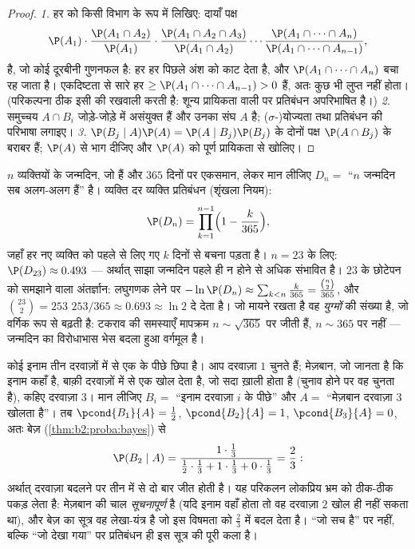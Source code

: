 \begin{proof}
\emph{1.} हर  को किसी विभाग के रूप में लिखिए:
दायाँ पक्ष
\[
\P(A_1)\cdot\frac{\P(A_1 \cap A_2)}{\P(A_1)}\cdot
\frac{\P(A_1 \cap A_2 \cap A_3)}{\P(A_1 \cap A_2)}\cdots
\frac{\P(A_1 \cap \dots \cap A_n)}{\P(A_1 \cap \dots \cap
A_{n-1})},
\]
है, जो कोई दूरबीनी गुणनफल है: हर हर पिछले अंश को काट देता है, और
$\P(A_1 \cap \dots \cap A_n)$ बचा रह जाता है। एकदिष्टता से सारे हर $\geq \P(A_1 \cap \dots \cap A_{n-1}) >
0$ हैं, अतः कुछ भी लुप्त
नहीं होता। (परिकल्पना ठीक इसी की रखवाली करती है: शून्य प्रायिकता
वाली  पर प्रतिबंधन अपरिभाषित है।)
\emph{2.} समुच्चय $A \cap B_i$ जोड़े-जोड़े में असंयुक्त हैं और उनका संघ $A$
है; ($\sigma$-)योज्यता तथा प्रतिबंधन की परिभाषा लगाइए।
\emph{3.} $\P(B_j \mid A)\P(A) = \P(A \mid
B_j)\P(B_j)$ के दोनों पक्ष $\P(A \cap B_j)$ के बराबर हैं; $\P(A)$ से भाग दीजिए और
$\P(A)$ को पूर्ण प्रायिकता से खोलिए।
\end{proof}

\begin{example}[जन्मदिन का टकराव, शृंखला नियम
से]\label{ex:b2:proba:birthday}
$n$ व्यक्तियों के जन्मदिन, जो  हैं और $365$ दिनों पर एकसमान,
लेकर मान लीजिए $D_n = {}$ ``$n$ जन्मदिन सब अलग-अलग हैं'' है। व्यक्ति दर
व्यक्ति प्रतिबंधन (शृंखला नियम):
\[
\P(D_n) = \prod_{k=1}^{n-1}\Bigl(1 - \frac{k}{365}\Bigr),
\]
जहाँ हर नए व्यक्ति को पहले से लिए गए $k$ दिनों से बचना पड़ता है।
$n = 23$ के लिए: $\P(D_{23}) \approx 0.493$ --- अर्थात् साझा जन्मदिन पहले ही न होने से अधिक
संभावित है। $23$ के छोटेपन को समझाने वाला अंतर्ज्ञान: लघुगणक लेने
पर $-\ln
\P(D_n) \approx \sum_{k<n}\frac k{365} =
\frac{\binom n2}{365}$, और $\binom{23}2 = 253$ $253/365 \approx 0.693 \approx \ln 2$ दे देता है। जो मायने रखता है वह
\emph{युग्मों} की संख्या है, जो वर्गिक रूप से बढ़ती है: टकराव की
समस्याएँ मापक्रम $n \sim \sqrt{365}$ पर जीती हैं, $n \sim
365$ पर नहीं --- जन्मदिन का
विरोधाभास भेस बदला हुआ वर्गमूल है।
\end{example}

\begin{example}[मॉन्टी हॉल, बेज़ से]\label{ex:b2:proba:montyhall}
कोई इनाम तीन दरवाज़ों में से एक के पीछे  छिपा है। आप
दरवाज़ा $1$ चुनते हैं; मेज़बान, जो जानता है कि इनाम कहाँ है, बाक़ी
दरवाज़ों में से एक खोल देता है, जो सदा ख़ाली होता है (चुनाव होने पर
वह  चुनता है), कहिए दरवाज़ा $3$। मान लीजिए $B_i = {}$
``इनाम दरवाज़ा $i$ के पीछे'' और $A = {}$ ``मेज़बान दरवाज़ा $3$ खोलता
है''। तब $\pcond{B_1}{A} = \frac12$, $\pcond{B_2}{A} = 1$, $\pcond{B_3}{A} = 0$, अतः बेज़ (\cref{thm:b2:proba:bayes}) से
\[
\P(B_2 \mid A)
= \frac{1\cdot\frac13}
{\frac12\cdot\frac13 + 1\cdot\frac13 + 0\cdot\frac13}
= \frac23 :
\]
अर्थात् दरवाज़ा बदलने पर तीन में से दो बार जीत होती है। यह परिकलन
लोकप्रिय भ्रम को ठीक-ठीक पकड़ लेता है: मेज़बान की चाल
\emph{सूचनापूर्ण} है (यदि इनाम वहाँ होता तो वह दरवाज़ा $2$ खोल ही
नहीं सकता था), और बेज़ का सूत्र वह लेखा-यंत्र है जो इस विषमता को
$\frac23$ में बदल देता है। ``जो सच है'' पर नहीं, बल्कि ``जो देखा गया''
पर प्रतिबंधन ही इस सूत्र की पूरी कला है।
\end{example}


